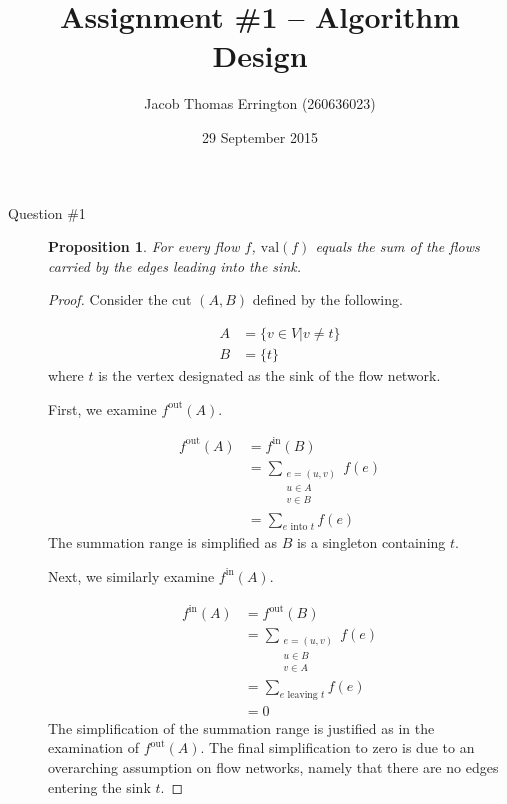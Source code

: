 \documentclass[letterpaper,11pt]{article}
\author{Jacob Thomas Errington (260636023)}
\date{29 September 2015}
\title{Assignment \#1 -- Algorithm Design}
\newtheorem{proposition}{Proposition}
\newcommand{\val}{\!\mathrm{val}}
\begin{document}
\maketitle

\begin{description}
    \item[Question \#1]

        \begin{proposition}
            For every flow $f$, $\val{(f)}$ equals the sum of the flows carried
            by the edges leading into the sink.
        \end{proposition}

        \begin{proof}
            Consider the cut $(A, B)$ defined by the following.

            \begin{align*}
                A &= \{ v \in V | v \neq t \} \\
                B &= \{ t \}
            \end{align*}
            where $t$ is the vertex designated as the sink of the flow network.

            First, we examine $f^\mathrm{out}(A)$.

            \begin{align*}
                f^\mathrm{out}(A) &= f^\mathrm{in}(B) \\
                                  &= \sum_{\substack{e = (u, v) \\ u \in A \\ v \in B}} f(e) \\
                                  &= \sum_{e \text{ into } t} f(e)
            \end{align*}
            The summation range is simplified as $B$ is a singleton containing
            $t$.

            Next, we similarly examine $f^\mathrm{in}(A)$.

            \begin{align*}
                f^\mathrm{in}(A) &= f^\mathrm{out}(B) \\
                                 &= \sum_{\substack{e = (u, v) \\ u \in B \\ v \in A}} f(e) \\
                                 &= \sum_{e \text{ leaving } t} f(e) \\
                                 &= 0
            \end{align*}
            The simplification of the summation range is justified as in the
            examination of $f^\mathrm{out}(A)$. The final simplification to
            zero is due to an overarching assumption on flow networks, namely
            that there are no edges entering the sink $t$.


\end{proof}
\end{description}
\end{document}
